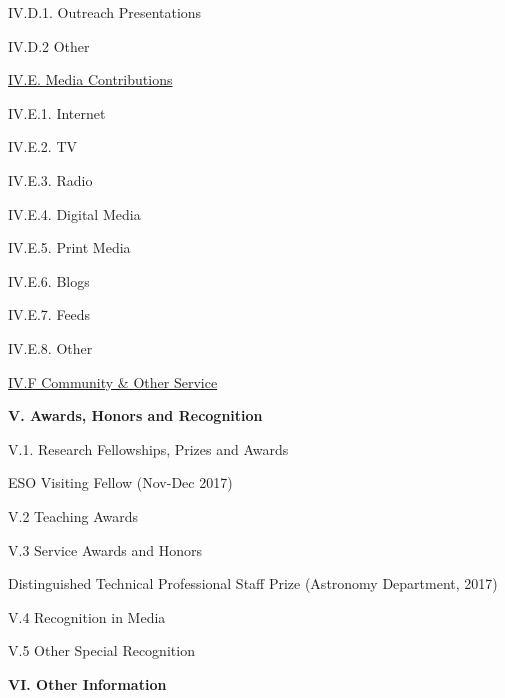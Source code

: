 \documentclass[11pt,letterpaper]{article}
\begin{document}
IV.D.1. Outreach Presentations

IV.D.2 Other


\underline{IV.E. Media Contributions}

IV.E.1. Internet

IV.E.2. TV

IV.E.3. Radio

IV.E.4. Digital Media

IV.E.5. Print Media 

IV.E.6. Blogs

IV.E.7. Feeds

IV.E.8. Other


\underline{IV.F Community \& Other Service}


\textbf{V. Awards, Honors and Recognition}

V.1. Research Fellowships, Prizes and Awards

ESO Visiting Fellow (Nov-Dec 2017)

V.2 Teaching Awards

V.3 Service Awards and Honors

Distinguished Technical Professional Staff Prize (Astronomy Department, 2017)

V.4 Recognition in Media 

V.5 Other Special Recognition


\textbf{VI. Other Information}
\end{document}
